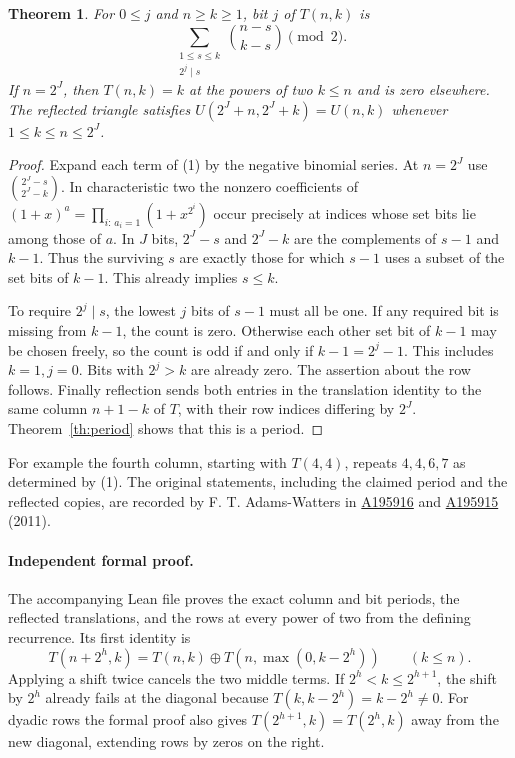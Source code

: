 \documentclass[11pt,letterpaper]{article}
\newtheorem{theorem}{Theorem}
\newcommand{\oeis}[1]{\href{https://oeis.org/A#1}{A#1}}
\begin{document}
\begin{theorem}
For \(0\le j\) and \(n\ge k\ge1\), bit \(j\) of \(T(n,k)\) is
\[
 \sum_{\substack{1\le s\le k\\2^j\mid s}}\binom{n-s}{k-s}\pmod 2 .
\]
If \(n=2^J\), then \(T(n,k)=k\) at the powers of two \(k\le n\) and is zero elsewhere. The reflected triangle satisfies \(U(2^J+n,2^J+k)=U(n,k)\) whenever \(1\le k\le n\le2^J\).
\end{theorem}
\begin{proof}
Expand each term of (1) by the negative binomial series. At \(n=2^J\) use \(\binom{2^J-s}{2^J-k}\). In characteristic two the nonzero coefficients of \((1+x)^a=\prod_{i:\,a_i=1}(1+x^{2^i})\) occur precisely at indices whose set bits lie among those of \(a\). In \(J\) bits, \(2^J-s\) and \(2^J-k\) are the complements of \(s-1\) and \(k-1\). Thus the surviving \(s\) are exactly those for which \(s-1\) uses a subset of the set bits of \(k-1\). This already implies \(s\le k\).

To require \(2^j\mid s\), the lowest \(j\) bits of \(s-1\) must all be one. If any required bit is missing from \(k-1\), the count is zero. Otherwise each other set bit of \(k-1\) may be chosen freely, so the count is odd if and only if \(k-1=2^j-1\). This includes \(k=1,j=0\). Bits with \(2^j>k\) are already zero. The assertion about the row follows. Finally reflection sends both entries in the translation identity to the same column \(n+1-k\) of \(T\), with their row indices differing by \(2^J\). Theorem~\ref{th:period} shows that this is a period.
\end{proof}

For example the fourth column, starting with \(T(4,4)\), repeats \(4,4,6,7\) as determined by (1).
The original statements, including the claimed period and the reflected copies, are recorded by F. T. Adams-Watters in \oeis{195916} and \oeis{195915} (2011).

\paragraph{Independent formal proof.}
The accompanying Lean file proves the exact column and bit periods, the reflected translations, and the rows at every power of two from the defining recurrence. Its first identity is
\[
 T(n+2^h,k)=T(n,k)\mathbin{\oplus}T(n,\max(0,k-2^h))\qquad(k\le n).
\]
Applying a shift twice cancels the two middle terms. If \(2^h<k\le2^{h+1}\), the shift by \(2^h\) already fails at the diagonal because \(T(k,k-2^h)=k-2^h\ne0\). For dyadic rows the formal proof also gives \(T(2^{h+1},k)=T(2^h,k)\) away from the new diagonal, extending rows by zeros on the right.
\end{document}
